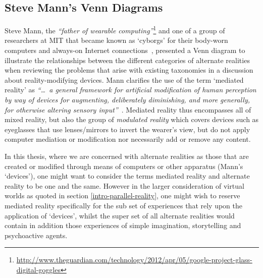 \subsection{Steve Mann's Venn Diagrams}
\label{stevemannvenn}
Steve Mann, the \textit{``father of wearable computing''}\footnote{\url{http://www.theguardian.com/technology/2012/apr/05/google-project-glass-digital-goggles}} and one of a group of researchers at MIT that became known as `cyborgs' for their body-worn computers and always-on Internet connections~\cite{Turkle2011}, presented a Venn diagram to illustrate the relationships between the different categories of alternate realities when reviewing the problems that arise with existing taxonomies in a discussion about reality-modifying devices. Mann clarifies the use of the term `mediated reality' as \textit{``\ldots\ a general framework for artificial modification of human perception by way of devices for augmenting, deliberately diminishing, and more generally, for otherwise altering sensory input''}~\cite{Mann2002a}. Mediated reality thus encompasses all of mixed reality, but also the group of \textit{modulated reality} which covers devices such as eyeglasses that use lenses/mirrors to invert the wearer's view, but do not apply computer mediation or modification nor necessarily add or remove any content.


In this thesis, where we are concerned with alternate realities as those that are created or modified through means of computers or other apparatus (Mann's `devices'), one might want to consider the terms mediated reality and alternate reality to be one and the same. However in the larger consideration of virtual worlds as quoted in section \ref{intro-parallel-reality}, one might wish to reserve mediated reality specifically for the sub set of experiences that rely upon the application of `devices', whilst the super set of all alternate realities would contain in addition those experiences of simple imagination, storytelling and psychoactive agents.

